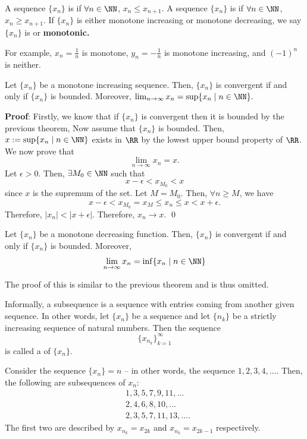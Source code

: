 \begin{definition}[Monotone]
A sequence $\{x_n\}$ is  if $\forall n\in \NN$, $x_{n}\leq x_{n+1}$. A sequence $\{x_n\}$ is  if $\forall n\in \NN$, $x_n \geq x_{n+1}$. If $\{x_n\}$ is either monotone increasing or monotone decreasing, we say $\{x_n\}$ is  or \textbf{monotonic.}
\end{definition}

\begin{example}
For example, $x_n =\frac{1}{n}$ is monotone, $y_n = -\frac{1}{n}$ is monotone increasing, and $(-1)^n$ is neither.
\end{example}

\begin{theorem}
Let $\{x_n\}$ be a monotone increasing sequence. Then, $\{x_n\}$ is convergent if and only if $\{x_n\}$ is bounded. Moreover, $\lim_{n\to \infty}x_n = \sup\{x_n \mid n\in \NN\}.$
\end{theorem}
\textbf{Proof}: Firstly, we know that if $\{x_n\}$ is convergent then it is bounded by the previous theorem, Now assume that $\{x_n\}$ is bounded. Then, $x:= \sup\{x_n \mid n\in \NN\}$ exists in $\RR$ by the lowest upper bound property of $\RR$. We now prove that 
\[
\lim_{n\to \infty}x_n = x.
\]
Let $\epsilon>0$. Then, $\exists M_0\in \NN$ such that 
\[
x-\epsilon < x_{M_0}<x
\]
since $x$ is the supremum of the set. Let $M = M_0$. Then, $\forall n\geq M$, we have 
\[
x-\epsilon < x_{M_0} = x_M \leq x_n \leq x < x+\epsilon.
\]
Therefore, $|x_n|< |x+\epsilon|$. Therefore, $x_n \to x$. \qed 

\begin{theorem}
Let $\{x_n\}$ be a monotone decreasing function. Then, $\{x_n\}$ is convergent if and only if $\{x_n\}$ is bounded. Moreover, 
\[
\lim_{n\to \infty} x_n = \inf\{x_n \mid n\in \NN\} 
\]
\end{theorem}
The proof of this is similar to the previous theorem and is thus omitted.

\begin{definition}[Subsequence]
Informally, a subsequence is a sequence with entries coming from another given sequence. In other words, let $\{x_n\}$ be a sequence and let $\{n_k\}$ be a strictly increasing sequence of natural numbers. Then the sequence 
\[
\{x_{n_k}\}_{k=1}^\infty
\]
is called a  of $\{x_n\}$.
\end{definition}

Consider the sequence $\{x_n\} = n$ -- in other words, the sequence $1,2,3,4,\dots$. Then, the following are subsequences of $x_n:$
\begin{align*}
    &1,3,5,7,9,11,\dots \\
    &2,4,6,8,10,\dots \\
    &2,3,5,7,11,13,\dots.
\end{align*}
The first two are described by $x_{n_k} = x_{2k}$ and $x_{n_k} = x_{2k-1}$ respectively. 

